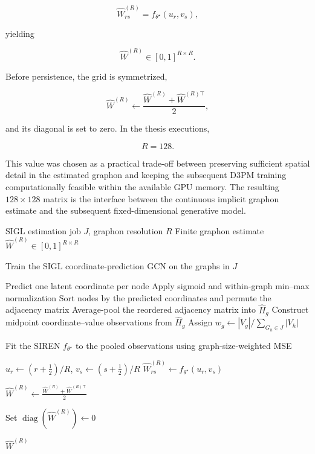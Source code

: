 \[
\widehat{W}^{(R)}_{rs}
=
f_{\theta^\star}(u_r,v_s),
\]

yielding

\[
\widehat{W}^{(R)}
\in
[0,1]^{R\times R}.
\]

Before persistence, the grid is symmetrized,

\[
\widehat{W}^{(R)}
\leftarrow
\frac{
\widehat{W}^{(R)}
+
\widehat{W}^{(R)\top}
}{2},
\]

and its diagonal is set to zero. In the thesis executions,

\[
R=128.
\]

This value was chosen as a practical trade-off between preserving sufficient spatial detail in the estimated graphon and keeping the subsequent D3PM training computationally feasible within the available GPU memory. 
The resulting \(128\times128\) matrix is the interface between the continuous implicit graphon estimate and the subsequent fixed-dimensional generative model.

\begin{algorithm}[H]
    \caption{Finite graphon estimation for one SIGL job}
    \label{alg:sigl_graphon_estimation}
    \begin{algorithmic}[1]
    
    \Require SIGL estimation job $J$, graphon resolution $R$
    \Ensure Finite graphon estimate
            $\widehat{W}^{(R)} \in [0,1]^{R\times R}$
    
    \State Train the SIGL coordinate-prediction GCN on the graphs in $J$
    
        \State Predict one latent coordinate per node
        \State Apply sigmoid and within-graph min--max normalization
        \State Sort nodes by the predicted coordinates and permute the adjacency matrix
        \State Average-pool the reordered adjacency matrix into $\widehat{H}_g$
        \State Construct midpoint coordinate--value observations from $\widehat{H}_g$
        \State Assign
        $
        w_g \gets
        |V_g| /
        \sum_{G_h \in J}|V_h|
        $
    \EndFor
    
    \State Fit the SIREN $f_{\theta^\star}$ to the pooled observations
           using graph-size-weighted MSE
    
        \State $u_r \gets (r+\tfrac{1}{2})/R$,
               $v_s \gets (s+\tfrac{1}{2})/R$
        \State $\widehat{W}^{(R)}_{rs}
               \gets f_{\theta^\star}(u_r,v_s)$
    \EndFor
    
    \State $\widehat{W}^{(R)}
           \gets
           \frac{
           \widehat{W}^{(R)}
           +
           \widehat{W}^{(R)\top}
           }{2}$
    
    \State Set $\operatorname{diag}(\widehat{W}^{(R)}) \gets 0$
    
    \State \Return $\widehat{W}^{(R)}$
    
    \end{algorithmic}
\end{algorithm}

